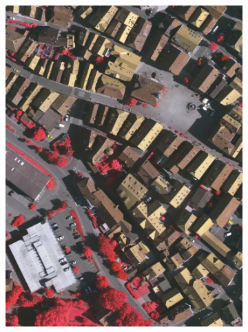 \begin{figure}[htb]
\begin{subfigure}{0.19\textwidth}
  \centering
  \includegraphics[width=1\linewidth]{fig/vai/5_irg.JPG}
\end{subfigure}\vspace{1mm}
\begin{subfigure}{0.19\textwidth}
  \centering

\end{subfigure}
\end{figure}
